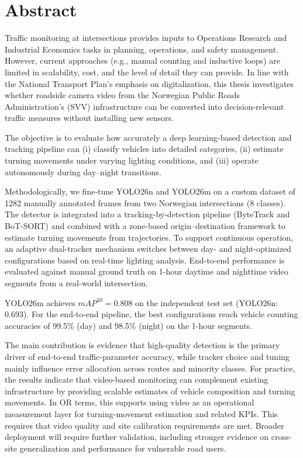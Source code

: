 \chapter*{Abstract}
\thispagestyle{frontmatter}

Traffic monitoring at intersections provides inputs to Operations Research and Industrial Economics tasks in planning, operations, and safety management. However, current approaches (e.g., manual counting and inductive loops) are limited in scalability, cost, and the level of detail they can provide. In line with the National Transport Plan’s emphasis on digitalization, this thesis investigates whether roadside camera video from the Norwegian Public Roads Administration’s (SVV) infrastructure can be converted into decision-relevant traffic measures without installing new sensors.

The objective is to evaluate how accurately a deep learning-based detection and tracking pipeline can (i) classify vehicles into detailed categories, (ii) estimate turning movements under varying lighting conditions, and (iii) operate autonomously during day--night transitions.

Methodologically, we fine-tune YOLO26n and YOLO26m on a custom dataset of 1282 manually annotated frames from two Norwegian intersections (8 classes). The detector is integrated into a tracking-by-detection pipeline (ByteTrack and BoT-SORT) and combined with a zone-based origin--destination framework to estimate turning movements from trajectories. To support continuous operation, an adaptive dual-tracker mechanism switches between day- and night-optimized configurations based on real-time lighting analysis. End-to-end performance is evaluated against manual ground truth on 1-hour daytime and nighttime video segments from a real-world intersection.

YOLO26m achieves $mAP^{50}=0.808$ on the independent test set (YOLO26n: 0.693). For the end-to-end pipeline, the best configurations reach vehicle counting accuracies of 99.5\% (day) and 98.5\% (night) on the 1-hour segments.

The main contribution is evidence that high-quality detection is the primary driver of end-to-end traffic-parameter accuracy, while tracker choice and tuning mainly influence error allocation across routes and minority classes. For practice, the results indicate that video-based monitoring can complement existing infrastructure by providing scalable estimates of vehicle composition and turning movements. In OR terms, this supports using video as an operational measurement layer for turning-movement estimation and related KPIs. This requires that video quality and site calibration requirements are met. Broader deployment will require further validation, including stronger evidence on cross-site generalization and performance for vulnerable road users.